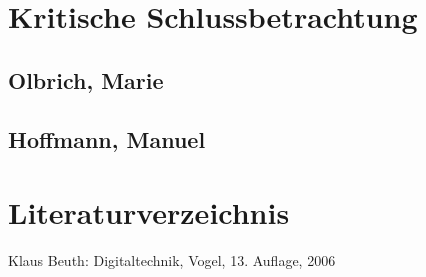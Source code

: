 \documentclass[a4paper, 11pt, fleqn, DIV=10, twoside, BCOR=10mm]{scrreprt}
\begin{document}
\chapter{Kritische Schlussbetrachtung}
\section{Olbrich, Marie}
 
\section{Hoffmann, Manuel}
 
\newpage
\chapter{Literaturverzeichnis}
Klaus Beuth: Digitaltechnik, Vogel, 13. Auflage, 2006
\end{document}
